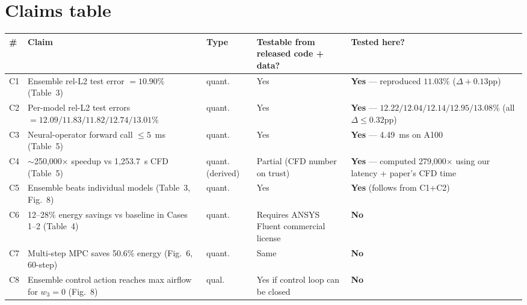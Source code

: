 \documentclass[10pt]{article}
\begin{document}
\section{Claims table}
\begin{longtable}{@{}p{0.5cm}p{7cm}p{2cm}p{3.5cm}p{2.5cm}@{}}
\toprule
\# & Claim & Type & Testable from released code + data? & Tested here? \\
\midrule
C1 & Ensemble rel-L2 test error $=10.90\%$ (Table~3) & quant. & Yes & \textbf{Yes} — reproduced $11.03\%$ ($\Delta{+}0.13$pp) \\
C2 & Per-model rel-L2 test errors $=12.09/11.83/11.82/12.74/13.01\%$ & quant. & Yes & \textbf{Yes} — $12.22/12.04/12.14/12.95/13.08\%$ (all $\Delta \leq 0.32$pp) \\
C3 & Neural-operator forward call $\leq 5$~ms (Table~5) & quant. & Yes & \textbf{Yes} — 4.49~ms on A100 \\
C4 & $\sim$250{,}000$\times$ speedup vs 1{,}253.7~s CFD (Table~5) & quant.(derived) & Partial (CFD number on trust) & \textbf{Yes} — computed 279{,}000$\times$ using our latency + paper's CFD time \\
C5 & Ensemble beats individual models (Table~3, Fig.~8) & quant. & Yes & \textbf{Yes} (follows from C1+C2) \\
C6 & 12--28\% energy savings vs baseline in Cases 1--2 (Table~4) & quant. & Requires ANSYS Fluent commercial license & \textbf{No} \\
C7 & Multi-step MPC saves 50.6\% energy (Fig.~6, 60-step) & quant. & Same & \textbf{No} \\
C8 & Ensemble control action reaches max airflow for $w_3{=}0$ (Fig.~8) & qual. & Yes if control loop can be closed & \textbf{No} \\
\bottomrule
\end{longtable}
\end{document}
